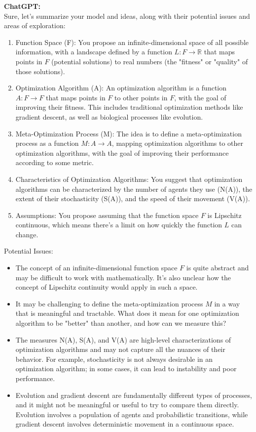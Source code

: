 \documentclass{article}[10pt]
\begin{document}
\noindent \textbf{ChatGPT:}\\
Sure, let's summarize your model and ideas, along with their potential issues and areas of exploration:\par
\begin{enumerate}
    \item Function Space (F): You propose an infinite-dimensional space of all possible information, with a landscape defined by a function \(L: F \rightarrow \mathbb{R}\) that maps points in \(F\) (potential solutions) to real numbers (the "fitness" or "quality" of those solutions). 
    \item Optimization Algorithm (A): An optimization algorithm is a function \(A: F \rightarrow F\) that maps points in \(F\) to other points in \(F\), with the goal of improving their fitness. 
    This includes traditional optimization methods like gradient descent, as well as biological processes like evolution.
    \item Meta-Optimization Process (M): The idea is to define a meta-optimization process as a function \(M: A \rightarrow A\), mapping optimization algorithms to other optimization algorithms, with the goal of improving their performance according to some metric.
    \item Characteristics of Optimization Algorithms: You suggest that optimization algorithms can be characterized by the number of agents they use (N(A)), the extent of their stochasticity (S(A)), and the speed of their movement (V(A)).
    \item Assumptions: You propose assuming that the function space \(F\) is Lipschitz continuous, which means there's a limit on how quickly the function \(L\) can change.
\end{enumerate}

Potential Issues:
\begin{itemize}
    \item The concept of an infinite-dimensional function space \(F\) is quite abstract and may be difficult to work with mathematically. 
    It's also unclear how the concept of Lipschitz continuity would apply in such a space.
    \item It may be challenging to define the meta-optimization process \(M\) in a way that is meaningful and tractable. 
    What does it mean for one optimization algorithm to be "better" than another, and how can we measure this?
    \item The measures N(A), S(A), and V(A) are high-level characterizations of optimization algorithms and may not capture all the nuances of their behavior. For example, stochasticity is not always desirable in an optimization algorithm; in some cases, it can lead to instability and poor performance.
    \item Evolution and gradient descent are fundamentally different types of processes, and it might not be meaningful or useful to try to compare them directly. 
    Evolution involves a population of agents and probabilistic transitions, while gradient descent involves deterministic movement in a continuous space.
\end{itemize}
\end{document}
